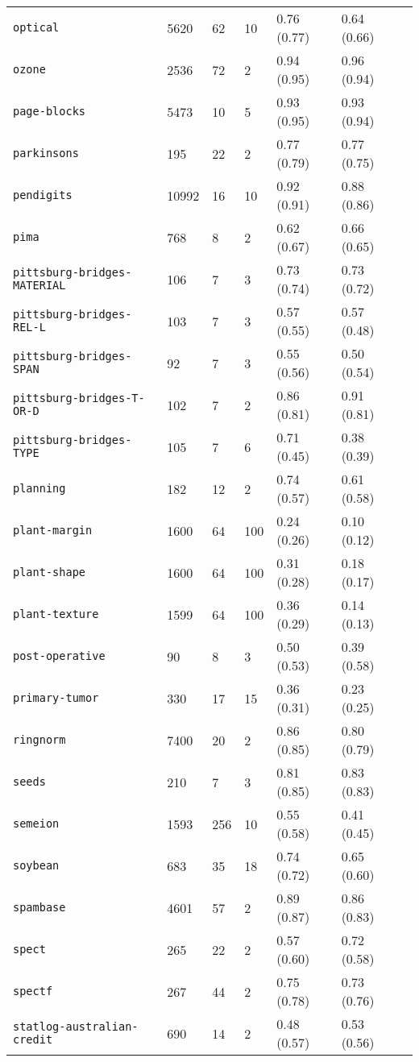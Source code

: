 \begin{tabular}{lllllll}
\verb!optical! & 5620 & 62 & 10 & 0.76 (0.77) & 0.64 (0.66)\\ 
\verb!ozone! & 2536 & 72 & 2 & 0.94 (0.95) & 0.96 (0.94)\\ 
\verb!page-blocks! & 5473 & 10 & 5 & 0.93 (0.95) & 0.93 (0.94)\\ 
\verb!parkinsons! & 195 & 22 & 2 & 0.77 (0.79) & 0.77 (0.75)\\ 
\verb!pendigits! & 10992 & 16 & 10 & 0.92 (0.91) & 0.88 (0.86)\\ 
\verb!pima! & 768 & 8 & 2 & 0.62 (0.67) & 0.66 (0.65)\\ 
\verb!pittsburg-bridges-MATERIAL! & 106 & 7 & 3 & 0.73 (0.74) & 0.73 (0.72)\\ 
\verb!pittsburg-bridges-REL-L! & 103 & 7 & 3 & 0.57 (0.55) & 0.57 (0.48)\\ 
\verb!pittsburg-bridges-SPAN! & 92 & 7 & 3 & 0.55 (0.56) & 0.50 (0.54)\\ 
\verb!pittsburg-bridges-T-OR-D! & 102 & 7 & 2 & 0.86 (0.81) & 0.91 (0.81)\\ 
\verb!pittsburg-bridges-TYPE! & 105 & 7 & 6 & 0.71 (0.45) & 0.38 (0.39)\\ 
\verb!planning! & 182 & 12 & 2 & 0.74 (0.57) & 0.61 (0.58)\\ 
\verb!plant-margin! & 1600 & 64 & 100 & 0.24 (0.26) & 0.10 (0.12)\\ 
\verb!plant-shape! & 1600 & 64 & 100 & 0.31 (0.28) & 0.18 (0.17)\\ 
\verb!plant-texture! & 1599 & 64 & 100 & 0.36 (0.29) & 0.14 (0.13)\\ 
\verb!post-operative! & 90 & 8 & 3 & 0.50 (0.53) & 0.39 (0.58)\\ 
\verb!primary-tumor! & 330 & 17 & 15 & 0.36 (0.31) & 0.23 (0.25)\\ 
\verb!ringnorm! & 7400 & 20 & 2 & 0.86 (0.85) & 0.80 (0.79)\\ 
\verb!seeds! & 210 & 7 & 3 & 0.81 (0.85) & 0.83 (0.83)\\ 
\verb!semeion! & 1593 & 256 & 10 & 0.55 (0.58) & 0.41 (0.45)\\ 
\verb!soybean! & 683 & 35 & 18 & 0.74 (0.72) & 0.65 (0.60)\\ 
\verb!spambase! & 4601 & 57 & 2 & 0.89 (0.87) & 0.86 (0.83)\\ 
\verb!spect! & 265 & 22 & 2 & 0.57 (0.60) & 0.72 (0.58)\\ 
\verb!spectf! & 267 & 44 & 2 & 0.75 (0.78) & 0.73 (0.76)\\ 
\verb!statlog-australian-credit! & 690 & 14 & 2 & 0.48 (0.57) & 0.53 (0.56)\\ 

\end{tabular}
